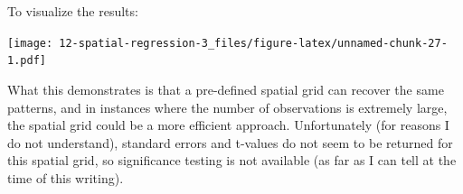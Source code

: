 \documentclass[
]{book}
\newenvironment{Shaded}{\begin{snugshade}}{\end{snugshade}}
\newcommand{\AttributeTok}[1]{\textcolor[rgb]{0.13,0.29,0.53}{#1}}
\newcommand{\CommentTok}[1]{\textcolor[rgb]{0.56,0.35,0.01}{\textit{#1}}}
\newcommand{\FunctionTok}[1]{\textcolor[rgb]{0.13,0.29,0.53}{\textbf{#1}}}
\newcommand{\NormalTok}[1]{#1}
\newcommand{\OtherTok}[1]{\textcolor[rgb]{0.56,0.35,0.01}{#1}}
\newcommand{\SpecialCharTok}[1]{\textcolor[rgb]{0.81,0.36,0.00}{\textbf{#1}}}
\newcommand{\StringTok}[1]{\textcolor[rgb]{0.31,0.60,0.02}{#1}}
\begin{document}
\begin{Shaded}
\end{Shaded}

To visualize the results:

\begin{Shaded}
\end{Shaded}

\texttt{[image: 12-spatial-regression-3\_files/figure-latex/unnamed-chunk-27-1.pdf]}

What this demonstrates is that a pre-defined spatial grid can recover the same patterns, and in instances where the number of observations is extremely large, the spatial grid could be a more efficient approach. Unfortunately (for reasons I do not understand), standard errors and t-values do not seem to be returned for this spatial grid, so significance testing is not available (as far as I can tell at the time of this writing).
\end{document}
